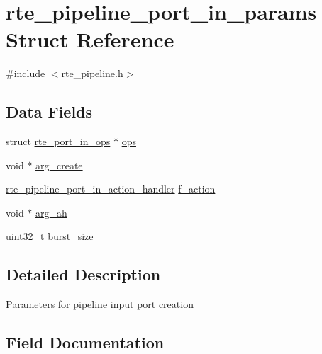 \hypertarget{structrte__pipeline__port__in__params}{}\section{rte\+\_\+pipeline\+\_\+port\+\_\+in\+\_\+params Struct Reference}
\label{structrte__pipeline__port__in__params}


{\ttfamily \#include $<$rte\+\_\+pipeline.\+h$>$}

\subsection*{Data Fields}
\begin{DoxyCompactItemize}
\item 
struct \hyperlink{structrte__port__in__ops}{rte\+\_\+port\+\_\+in\+\_\+ops} $\ast$ \hyperlink{structrte__pipeline__port__in__params_ad8c92480b58ad5e6b7917c16b5ea7b3d}{ops}
\item 
void $\ast$ \hyperlink{structrte__pipeline__port__in__params_ab34a217f23d1f5a27ae00e3fbbba445c}{arg\+\_\+create}
\item 
\hyperlink{rte__pipeline_8h_a90d56777317f0919ad4130f8ad2099be}{rte\+\_\+pipeline\+\_\+port\+\_\+in\+\_\+action\+\_\+handler} \hyperlink{structrte__pipeline__port__in__params_a2022419304fcae7f13851d3cb0f99a96}{f\+\_\+action}
\item 
void $\ast$ \hyperlink{structrte__pipeline__port__in__params_adfcedab79c75f0129bd5382cf3d48b13}{arg\+\_\+ah}
\item 
uint32\+\_\+t \hyperlink{structrte__pipeline__port__in__params_a39c7ba8da6420cf650de391a0ccb43b1}{burst\+\_\+size}
\end{DoxyCompactItemize}


\subsection{Detailed Description}
Parameters for pipeline input port creation 

\subsection{Field Documentation}
\hypertarget{structrte__pipeline__port__in__params_adfcedab79c75f0129bd5382cf3d48b13}{}
